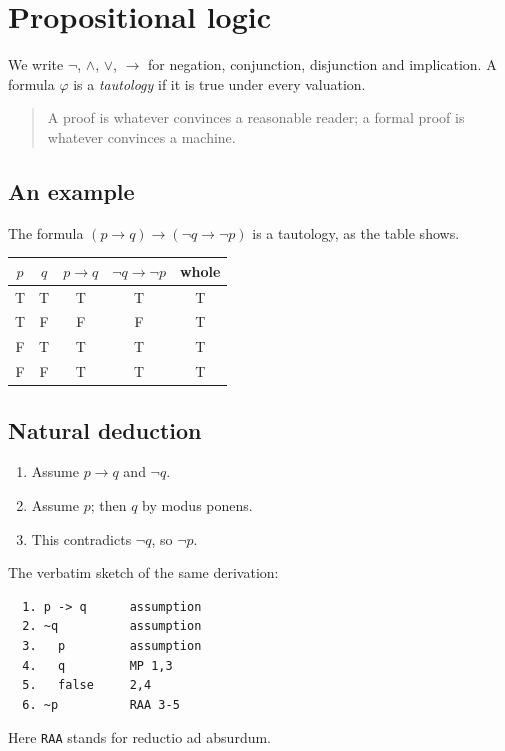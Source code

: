 \documentclass[11pt,letterpaper]{article}
\begin{document}
\section{Propositional logic}
We write $\neg$, $\wedge$, $\vee$, $\to$ for negation, conjunction, disjunction and implication. A formula $\varphi$ is a \emph{tautology} if it is true under every valuation.

\begin{quote}
A proof is whatever convinces a reasonable reader; a formal proof is whatever convinces a machine.
\end{quote}

\subsection{An example}
The formula $(p\to q)\to(\neg q\to\neg p)$ is a tautology, as the table shows.
\begin{center}
\begin{tabular}{cc|c|c|c}
$p$ & $q$ & $p\to q$ & $\neg q\to\neg p$ & whole\\ \hline
T & T & T & T & T\\
T & F & F & F & T\\
F & T & T & T & T\\
F & F & T & T & T
\end{tabular}
\end{center}

\subsection{Natural deduction}
\begin{enumerate}
\item Assume $p\to q$ and $\neg q$.
\item Assume $p$; then $q$ by modus ponens.
\item This contradicts $\neg q$, so $\neg p$.
\end{enumerate}
\smallskip
The verbatim sketch of the same derivation:
\begin{verbatim}
  1. p -> q      assumption
  2. ~q          assumption
  3.   p         assumption
  4.   q         MP 1,3
  5.   false     2,4
  6. ~p          RAA 3-5
\end{verbatim}
Here \verb|RAA| stands for reductio ad absurdum.
\end{document}
